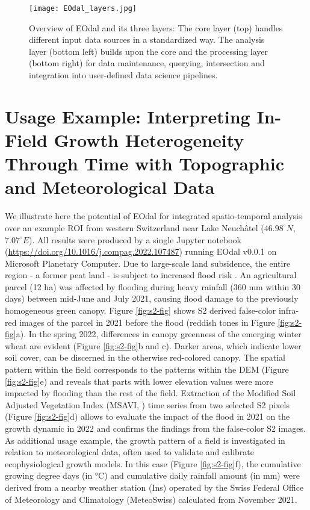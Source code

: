 \begin{figure}[H]
    \centering
    \texttt{[image: EOdal\_layers.jpg]}
    \caption{Overview of EOdal and its three layers: The core layer (top) handles different input data sources in a standardized way. The analysis layer (bottom left) builds upon the core and the processing layer (bottom right) for data maintenance, querying, intersection and integration into user-defined data science pipelines.}
    \label{fig:overview}
\end{figure}

\section{Usage Example: Interpreting In-Field Growth Heterogeneity Through Time with Topographic and Meteorological Data}
\label{sec:reprod_example}
We illustrate here the potential of EOdal for integrated spatio-temporal analysis over an example ROI from western Switzerland near Lake Neuchâtel ($46.98^\circ N$, $7.07^\circ E$). All results were produced by a single Jupyter notebook (\url{https://doi.org/10.1016/j.compag.2022.107487}) running EOdal v0.0.1 on Microsoft Planetary Computer. Due to large-scale land subsidence, the entire region - a former peat land - is subject to increased flood risk \citep{egli_landschaftsdynamik_2020}. An agricultural parcel (12 ha) was affected by flooding during heavy rainfall (360 mm within 30 days) between mid-June and July 2021, causing flood damage to the previously homogeneous green canopy. Figure \ref{fig:s2-fig} shows S2 derived false-color infra-red images of the parcel in 2021 before the flood (reddish tones in Figure \ref{fig:s2-fig}a). In the spring 2022, differences in canopy greenness of the emerging winter wheat are evident (Figure \ref{fig:s2-fig}b and c). Darker areas, which indicate lower soil cover, can be discerned in the otherwise red-colored canopy. The spatial pattern within the field corresponds to the patterns within the DEM (Figure \ref{fig:s2-fig}e) and reveals that parts with lower elevation values were more impacted by flooding than the rest of the field. Extraction of the Modified Soil Adjusted Vegetation Index (MSAVI, \cite{qi_modified_1994}) time series from two selected S2 pixels (Figure \ref{fig:s2-fig}d) allows to evaluate the impact of the flood in 2021 on the growth dynamic in 2022 and confirms the findings from the false-color S2 images.
As additional usage example, the growth pattern of a field is investigated in relation to meteorological data, often used to validate and calibrate ecophysiological growth models. In this case (Figure \ref{fig:s2-fig}f), the cumulative growing degree days (in °C) and cumulative daily rainfall amount (in mm) were derived from a nearby weather station (Ins) operated by the Swiss Federal Office of Meteorology and Climatology (MeteoSwiss) calculated from November  2021.

